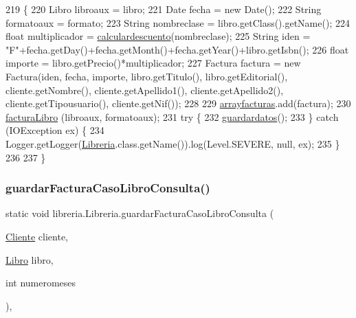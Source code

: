 \begin{DoxyCode}
219                                                                                                     \{
220          Libro libroaux = libro;
221          Date fecha = \textcolor{keyword}{new} Date();
222          String formatoaux = formato;
223          String nombreclase = libro.getClass().getName();
224          \textcolor{keywordtype}{float} multiplicador = \mbox{\hyperlink{classlibreria_1_1_libreria_a33f2cc093f3c15f09e146283e0c025d7}{calculardescuento}}(nombreclase);
225          String iden = \textcolor{stringliteral}{"F"}+fecha.getDay()+fecha.getMonth()+fecha.getYear()+libro.getIsbn();
226          \textcolor{keywordtype}{float} importe = libro.getPrecio()*multiplicador;
227          Factura factura = \textcolor{keyword}{new} Factura(iden, fecha, importe, libro.getTitulo(), libro.getEditorial(), 
      cliente.getNombre(), cliente.getApellido1(), cliente.getApellido2(), cliente.getTipousuario(), cliente.getNif());
228          
229          \mbox{\hyperlink{classlibreria_1_1_libreria_a1b6aaea2b6d1d95a7e25b85881e82721}{arrayfacturas}}.add(factura);
230          \mbox{\hyperlink{classlibreria_1_1_libreria_ac64f9e699ce3d10290c3f3303611b04a}{facturaLibro}} (libroaux, formatoaux);
231     \textcolor{keywordflow}{try} \{
232         \mbox{\hyperlink{classlibreria_1_1_libreria_abc10249e70e74a9ba55a081bbf23cfcd}{guardardatos}}();
233     \} \textcolor{keywordflow}{catch} (IOException ex) \{
234         Logger.getLogger(\mbox{\hyperlink{classlibreria_1_1_libreria_a93220dd4de47ee3b7ef4b2a90701c253}{Libreria}}.class.getName()).log(Level.SEVERE, null, ex);
235     \}
236          
237      \}
\end{DoxyCode}
\mbox{\label{classlibreria_1_1_libreria_a6d56a0ad8d97bfa5625e6712eeba1ec3}} 
\subsubsection{\texorpdfstring{guardar\+Factura\+Caso\+Libro\+Consulta()}{guardarFacturaCasoLibroConsulta()}}
{\footnotesize\ttfamily static void libreria.\+Libreria.\+guardar\+Factura\+Caso\+Libro\+Consulta (\begin{DoxyParamCaption}\item[{\mbox{\hyperlink{classlibreria_1_1_cliente}{Cliente}}}]{cliente,  }\item[{\mbox{\hyperlink{classlibreria_1_1_libro}{Libro}}}]{libro,  }\item[{int}]{numeromeses }\end{DoxyParamCaption})\hspace{0.3cm}{\ttfamily [inline]}, {\ttfamily [static]}}


